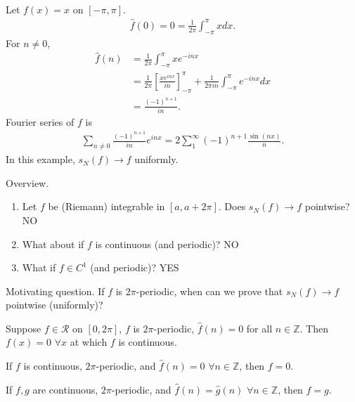 \documentclass[11pt]{article}
\begin{document}
\begin{example} Let $f(x) = x$ on $[-\pi, \pi]$. \begin{align*} \hat{f} (0) = 0 = \frac{1}{2\pi} \int_{-\pi}^\pi x dx.
\end{align*}
For $n \neq 0$, \begin{align*} \hat{f}(n) & = \frac{1}{2\pi} \int_{-\pi}^\pi xe^{-inx} \\ & = \frac{1}{2\pi} \left[ \frac{xe^{inx}}{in} \right]_{-\pi}^\pi + \frac{1}{2\pi in} \int_{-\pi}^\pi e^{-inx} dx \\ & = \frac{(-1)^{n + 1}}{in}.
\end{align*}
Fourier series of $f$ is \begin{align*} \sum_{n \neq 0} \frac{(-1)^{n + 1}}{in} e^{inx} = 2 \sum_1^\infty (-1)^{n + 1} \frac{\sin (nx)}{n}.
\end{align*}
In this example, $s_N(f) \to f$ uniformly.
\end{example}

Overview. \begin{enumerate}
\item Let $f$ be (Riemann) integrable in $[a, a + 2\pi]$. Does $s_N(f) \to f$ pointwise? NO
\item What about if $f$ is continuous (and periodic)? NO
\item What if $f \in C^1$ (and periodic)? YES
  
\end{enumerate}

Motivating question. If $f$ is $2\pi$-periodic, when can we prove that $s_N(f) \to f$ pointwise (uniformly)?

\begin{theorem} Suppose $f \in \mathscr{R}$ on $[0, 2\pi]$, $f$ is $2\pi$-periodic, $\hat{f}(n) = 0$ for all $n \in \mathbb{Z}$. Then $f(x) = 0$ $\forall x$ at which $f$ is continuous. 
\end{theorem}

\begin{corollary} If $f$ is continuous, $2\pi$-periodic, and $\hat{f}(n) =0$ $\forall n \in \mathbb{Z}$, then $f =0$.
\end{corollary}

\begin{corollary} If $f, g$ are continuous, $2\pi$-periodic, and $\hat{f}(n) = \hat{g}(n)$ $\forall n \in \mathbb{Z}$, then $f = g$.
\end{corollary}
\end{document}
